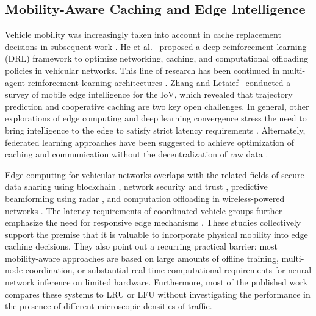 \documentclass[preprint,12pt]{elsarticle}
\begin{document}
	\subsection{Mobility-Aware Caching and Edge Intelligence}
	Vehicle mobility was increasingly taken into account in cache replacement decisions in subsequent work \cite{Liu_2020a, Zhao_2019}. He et al.~\cite{he2018mobility} proposed a deep reinforcement learning (DRL) framework to optimize networking, caching, and computational offloading policies in vehicular networks. This line of research has been continued in multi-agent reinforcement learning architectures \cite{Peng_2021, Liang_2019}. Zhang and Letaief~\cite{zhang2020mobile} conducted a survey of mobile edge intelligence for the IoV, which revealed that trajectory prediction and cooperative caching are two key open challenges. In general, other explorations of edge computing and deep learning convergence stress the need to bring intelligence to the edge to satisfy strict latency requirements \cite{Wang_2020, Zhou_2019, Chen_2019, Wang_2019a}. Alternately, federated learning approaches have been suggested to achieve optimization of caching and communication without the decentralization of raw data \cite{Lim_2020, Wang_2019}.
	
	Edge computing for vehicular networks overlaps with the related fields of secure data sharing using blockchain \cite{Yang_2019, Kang_2019}, network security and trust \cite{Lu_2019}, predictive beamforming using radar \cite{Liu_2020}, and computation offloading in wireless-powered networks \cite{Huang_2020}. The latency requirements of coordinated vehicle groups \cite{Feng_2019} further emphasize the need for responsive edge mechanisms \cite{Tang_2020}. These studies collectively support the premise that it is valuable to incorporate physical mobility into edge caching decisions. They also point out a recurring practical barrier: most mobility-aware approaches are based on large amounts of offline training, multi-node coordination, or substantial real-time computational requirements for neural network inference on limited hardware. Furthermore, most of the published work compares these systems to LRU or LFU without investigating the performance in the presence of different microscopic densities of traffic.
	
\end{document}
